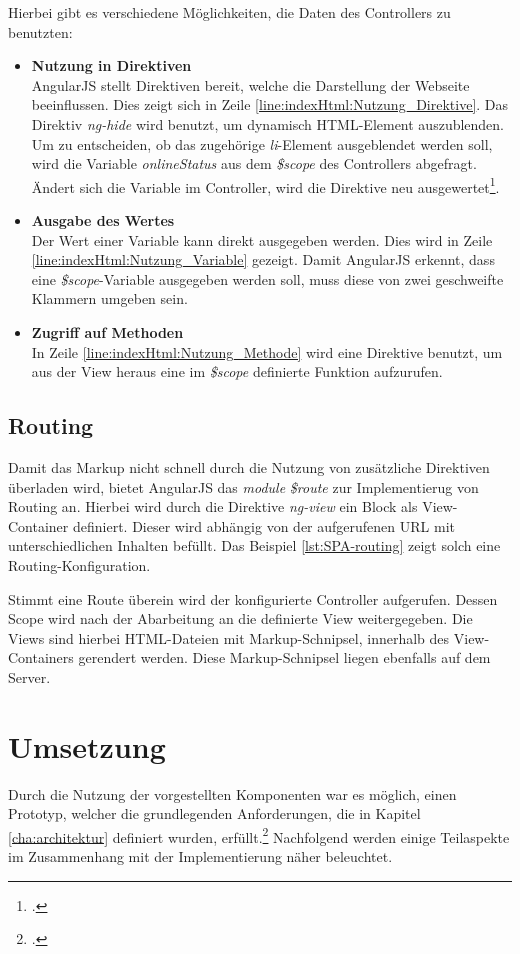 Hierbei gibt es verschiedene Möglichkeiten, die Daten des Controllers zu benutzten: 
\begin{itemize}
\item \textbf{Nutzung in Direktiven}\\
AngularJS stellt Direktiven bereit, welche die Darstellung der Webseite beeinflussen. Dies zeigt sich in Zeile \ref{line:indexHtml:Nutzung_Direktive}. Das Direktiv \textit{ng-hide} wird benutzt, um dynamisch HTML-Element auszublenden. Um zu entscheiden, ob das zugehörige \textit{li}-Element ausgeblendet werden soll, wird die Variable \textit{onlineStatus} aus dem \textit{\$scope} des Controllers abgefragt. Ändert sich die Variable im Controller, wird die Direktive neu ausgewertet\footcite{online:angular:diretive}.
\item \textbf{Ausgabe des Wertes}\\
Der Wert einer Variable kann direkt ausgegeben werden. Dies wird in Zeile \ref{line:indexHtml:Nutzung_Variable} gezeigt. Damit AngularJS erkennt, dass eine \textit{\$scope}-Variable ausgegeben werden soll, muss diese von zwei geschweifte Klammern umgeben sein.
\item \textbf{Zugriff auf Methoden}\\
In Zeile \ref{line:indexHtml:Nutzung_Methode} wird eine Direktive benutzt, um aus der View heraus eine im \textit{\$scope} definierte Funktion aufzurufen.
\end{itemize}
\subsection{Routing}
\label{ssec:SPA-Routing}
Damit das Markup nicht schnell durch die Nutzung von zusätzliche Direktiven überladen wird, bietet AngularJS das \textit{module} \textit{\$route} zur Implementierug von Routing an. Hierbei wird durch die Direktive \textit{ng-view} ein Block als View-Container definiert. Dieser wird abhängig von der aufgerufenen URL mit unterschiedlichen Inhalten befüllt. Das Beispiel \ref{lst:SPA-routing} zeigt solch eine Routing-Konfiguration. 

Stimmt eine Route überein wird der konfigurierte Controller aufgerufen. Dessen Scope wird nach der Abarbeitung an die definierte View weitergegeben. Die Views sind hierbei \ac{HTML}-Dateien mit Markup-Schnipsel, innerhalb des View-Containers gerendert werden. Diese Markup-Schnipsel liegen ebenfalls auf dem Server. 
\section{Umsetzung}
\label{sec:SPA-Umsetzung}
Durch die Nutzung der vorgestellten Komponenten war es möglich, einen Prototyp, welcher die grundlegenden Anforderungen, die in Kapitel \ref{cha:architektur} definiert wurden, erfüllt.\footcite{online:Created_SPA} Nachfolgend werden einige Teilaspekte im Zusammenhang mit der Implementierung näher beleuchtet.
